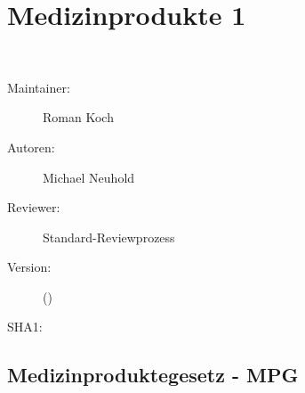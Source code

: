 % 
\def\ChapterCode{MP1}
\chapter
[\CO{[MP1]} Medizinprodukte 1]
{Medizinprodukte 1}
\label{chp:GER}
\label{chp:MP1}

\ChapterIntro
{%
~
}
{%
\begin{description}
  \item[Maintainer:] Roman Koch
  \item[Autoren:] Michael Neuhold
  \item[Reviewer:] Standard-Reviewprozess
  \item[Version:] {\VarDocVersionTypeName} ({\VarDocVersionTypeDescription})
  \item[SHA1:] {\DocGitCommit}
\end{description}

{\TxTeilkapitelAASS}
}


\clearpage %


\section{Medizinproduktegesetz - MPG}
\label{topic:mpg-info}




